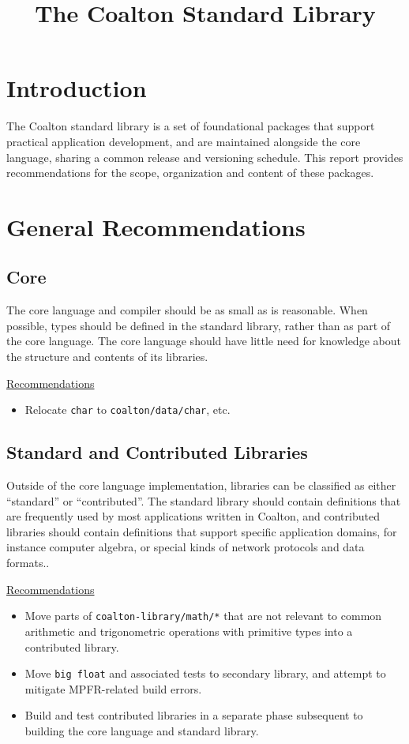 \documentclass[12pt]{article}
\title{The Coalton Standard Library}
\newcommand{\code}{\texttt}
\begin{document}
\maketitle
\section{Introduction}
The Coalton standard library is a set of foundational packages that
support practical application development, and are maintained alongside
the core language, sharing a common release and versioning
schedule. This report provides recommendations for the scope,
organization and content of these packages.

\section{General Recommendations}

\subsection{Core}

The core language and compiler should be as small as is reasonable.
When possible, types should be defined in the standard library, rather
than as part of the core language. The core language should have
little need for knowledge about the structure and contents of its
libraries.

\bigskip
\underline{Recommendations}

\begin{itemize}
\item Relocate \code{char} to \code{coalton/data/char}, etc.
\end{itemize}

\subsection{Standard and Contributed Libraries}

Outside of the core language implementation, libraries can be
classified as either ``standard'' or ``contributed''.  The standard
library should contain definitions that are frequently used by most
applications written in Coalton, and contributed libraries should
contain definitions that support specific application domains, for
instance computer algebra, or special kinds of network protocols and
data formats..

\bigskip
\underline{Recommendations}

\begin{itemize}
\item Move parts of \code{coalton-library/math/*} that are not
  relevant to common arithmetic and trigonometric operations with
  primitive types into a contributed library.
\item Move \code{big float} and associated tests to secondary library,
  and attempt to mitigate MPFR-related build errors.
\item Build and test contributed libraries in a separate phase
  subsequent to building the core language and standard library.
\end{itemize}
\end{document}
